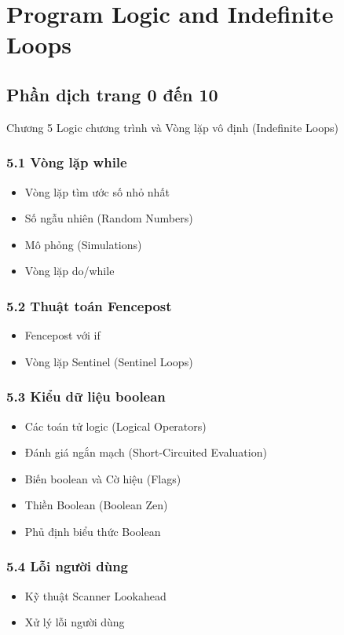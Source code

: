 \chapter{Program Logic and Indefinite Loops}

\section{Phần dịch trang 0 đến 10}
Chương 5 Logic chương trình và Vòng lặp vô định (Indefinite Loops)

\subsection*{5.1 Vòng lặp while}
\begin{itemize}
    \item Vòng lặp tìm ước số nhỏ nhất
    \item Số ngẫu nhiên (Random Numbers)
    \item Mô phỏng (Simulations)
    \item Vòng lặp do/while
\end{itemize}

\subsection*{5.2 Thuật toán Fencepost}
\begin{itemize}
    \item Fencepost với if
    \item Vòng lặp Sentinel (Sentinel Loops)
\end{itemize}

\subsection*{5.3 Kiểu dữ liệu boolean}
\begin{itemize}
    \item Các toán tử logic (Logical Operators)
    \item Đánh giá ngắn mạch (Short-Circuited Evaluation)
    \item Biến boolean và Cờ hiệu (Flags)
    \item Thiền Boolean (Boolean Zen)
    \item Phủ định biểu thức Boolean
\end{itemize}

\subsection*{5.4 Lỗi người dùng}
\begin{itemize}
    \item Kỹ thuật Scanner Lookahead
    \item Xử lý lỗi người dùng
\end{itemize}

